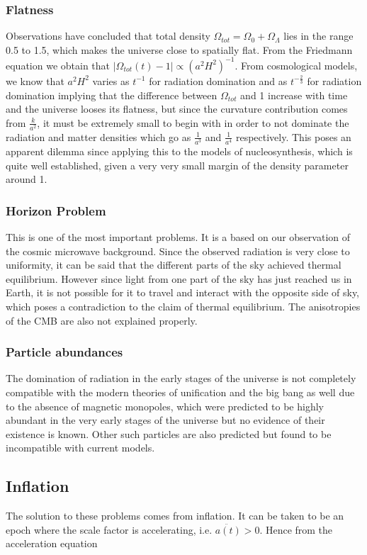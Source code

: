 \documentclass{article}
\begin{document}
 \subsubsection{Flatness}
 Observations have concluded that total density $\Omega_{tot} = \Omega_0 + \Omega_{\Lambda}$ lies in the range 0.5 to 1.5, which makes the universe close to spatially flat. From the Friedmann equation we obtain that $|{\Omega_{tot}(t)-1}| \propto (a^2H^2)^{-1}$. From cosmological models, we know that $a^2H^2$ varies as $t^{-1}$ for radiation domination and as $t^{-\frac{2}{3}}$ for radiation domination implying that the difference between $\Omega_{tot}$ and 1 increase with time and the universe looses its flatness, but since the curvature contribution comes from $\frac{k}{a^2}$, it must be extremely small to begin with in order to not dominate the radiation and matter densities which go as $\frac{1}{a^3}$ and $\frac{1}{a^4}$ respectively. This poses an apparent dilemma since applying this to the models of nucleosynthesis, which is quite well established, given a very very small margin of the density parameter around 1.
 \subsubsection{Horizon Problem}
 This is one of the most important problems. It is a based on our observation of the cosmic microwave background. Since the observed radiation is very close to uniformity, it can be said that the different parts of the sky achieved thermal equilibrium. However since light from one part of the sky has just reached us in Earth, it is not possible for it to travel and interact with the opposite side of sky, which poses a contradiction to the claim of thermal equilibrium. The anisotropies of the CMB are also not explained properly.
 \subsubsection{ Particle abundances}
 The domination of radiation in the early stages of the universe is not completely compatible with the modern theories of unification and the big bang as well due to the absence of magnetic monopoles, which were predicted to be highly abundant in the very early stages of the universe but no evidence of their existence is known. Other such particles are also predicted but found to be incompatible with current models.
 
 \subsection{Inflation}
 The solution to these problems comes from inflation. It can be taken to be an epoch where the scale factor is accelerating, i.e. $\ddot{a(t)}>0$. 
 Hence from the acceleration equation 
 
\end{document}
